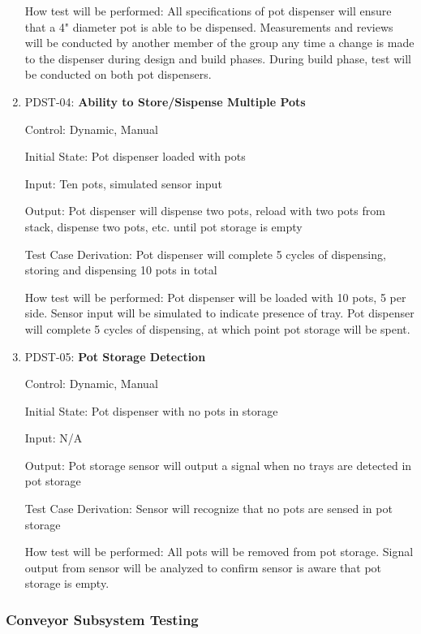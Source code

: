 \documentclass[12pt, titlepage]{article}
\begin{document}
\begin{enumerate}
  How test will be performed: All specifications of pot dispenser will ensure that a 4" diameter pot is able 
  to be dispensed. Measurements and reviews will be conducted by another member of the group any time a change 
  is made to the dispenser during design and build phases. During build phase, test will be conducted on both 
  pot dispensers.\\

  \item{PDST-04: \textbf{Ability to Store/Sispense Multiple Pots}}
  
  Control: Dynamic, Manual

  Initial State: Pot dispenser loaded with pots

  Input: Ten pots, simulated sensor input

  Output: Pot dispenser will dispense two pots, reload with two pots from stack, dispense two pots, etc. until
  pot storage is empty

  Test Case Derivation: Pot dispenser will complete 5 cycles of dispensing, storing and dispensing 10 pots in total

  How test will be performed: Pot dispenser will be loaded with 10 pots, 5 per side. Sensor input will be simulated
  to indicate presence of tray. Pot dispenser will complete 5 cycles of dispensing, at which point pot storage will
  be spent.\\
  
  \item{PDST-05: \textbf{Pot Storage Detection}}
  
  Control: Dynamic, Manual

  Initial State: Pot dispenser with no pots in storage

  Input: N/A

  Output: Pot storage sensor will output a signal when no trays are detected in pot storage

  Test Case Derivation: Sensor will recognize that no pots are sensed in pot storage

  How test will be performed: All pots will be removed from pot storage. Signal output from sensor will be
  analyzed to confirm sensor is aware that pot storage is empty.\\

\end{enumerate}

\subsubsection{Conveyor Subsystem Testing}
\end{document}
